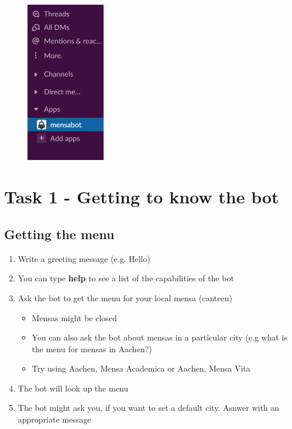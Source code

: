 \begin{figure}[h]
    \centering
    \includegraphics[height=7cm]{bot.png}
\end{figure}


      
\section*{Task 1 - Getting to know the bot}
\subsection*{Getting the menu}
\begin{enumerate}
    \item Write a greeting message (e.g. Hello)
    \item You can type \textbf{help} to see a list of the capabilities of the bot
    \item Ask the bot to get the menu for your local mensa (canteen)
    \begin{itemize}
      \item Mensas might be closed
      \item You can also ask the bot about mensas in a particular city (e.g what is the menu for mensas in Aachen?)
      \item Try using Aachen, Mensa Academica or Aachen, Mensa Vita
    \end{itemize}
    \item The bot will look up the menu
    \item The bot might ask you, if you want to set a default city. Asnwer with an appropriate message
\end{enumerate}
